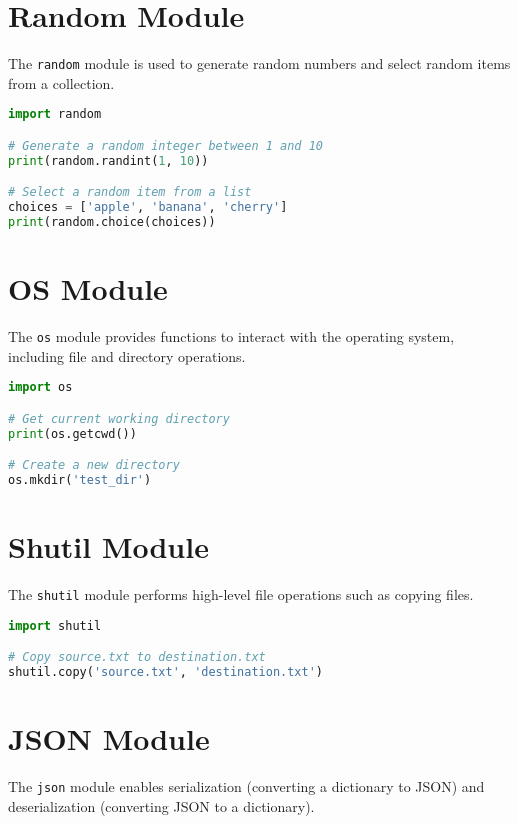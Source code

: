 \section{Random Module}

The \texttt{random} module is used to generate random numbers and select random items from a collection.

\begin{lstlisting}[language=Python]
import random

# Generate a random integer between 1 and 10
print(random.randint(1, 10))

# Select a random item from a list
choices = ['apple', 'banana', 'cherry']
print(random.choice(choices))
\end{lstlisting}

\section{OS Module}

The \texttt{os} module provides functions to interact with the operating system, including file and directory operations.

\begin{lstlisting}[language=Python]
import os

# Get current working directory
print(os.getcwd())

# Create a new directory
os.mkdir('test_dir')
\end{lstlisting}

\section{Shutil Module}

The \texttt{shutil} module performs high-level file operations such as copying files.

\begin{lstlisting}[language=Python]
import shutil

# Copy source.txt to destination.txt
shutil.copy('source.txt', 'destination.txt')
\end{lstlisting}

\section{JSON Module}

The \texttt{json} module enables serialization (converting a dictionary to JSON) and deserialization (converting JSON to a dictionary).

